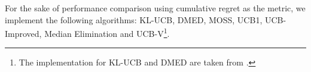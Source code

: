 %
%
%
%
%
%
%
%


For the sake of performance comparison using cumulative regret as the metric, we implement the following algorithms:  KL-UCB\cite{garivier2011kl}, DMED\cite{honda2010asymptotically}, MOSS\cite{audibert2009minimax}, UCB1\cite{auer2002finite}, UCB-Improved\cite{auer2010ucb}, Median Elimination\cite{even2006action} and UCB-V\cite{audibert2009exploration}\footnote{The implementation for KL-UCB and DMED are taken from \cite{CapGarKau12}.}.

